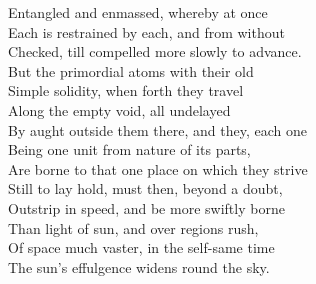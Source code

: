 Entangled and enmassed, whereby at once\\
Each is restrained by each, and from without\\
Checked, till compelled more slowly to advance.\\
But the primordial atoms with their old\\
Simple solidity, when forth they travel\\
Along the empty void, all undelayed\\
By aught outside them there, and they, each one\\
Being one unit from nature of its parts,\\
Are borne to that one place on which they strive\\
Still to lay hold, must then, beyond a doubt,\\
Outstrip in speed, and be more swiftly borne\\
Than light of sun, and over regions rush,\\
Of space much vaster, in the self-same time\\
The sun's effulgence widens round the sky.

